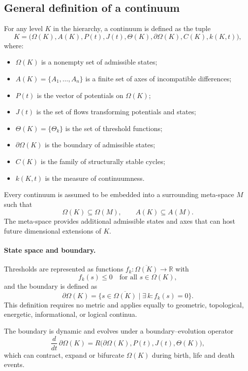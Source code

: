 \subsection{General definition of a continuum}

For any level \(K\) in the hierarchy, a continuum is defined as the tuple
\[
    K = \big(\Omega(K), A(K), P(t), J(t), \Theta(K), \partial\Omega(K), C(K), k(K,t)\big),
\]
where:
\begin{itemize}
    \item \(\Omega(K)\) is a nonempty set of admissible states;
    \item \(A(K) = \{A_1,\dots,A_n\}\) is a finite set of axes of incompatible differences;
    \item \(P(t)\) is the vector of potentials on \(\Omega(K)\);
    \item \(J(t)\) is the set of flows transforming potentials and states;
    \item \(\Theta(K) = \{\Theta_k\}\) is the set of threshold functions;
    \item \(\partial\Omega(K)\) is the boundary of admissible states;
    \item \(C(K)\) is the family of structurally stable cycles;
    \item \(k(K,t)\) is the measure of continuumness.
\end{itemize}

Every continuum is assumed to be embedded into a surrounding meta-space \(M\) such that
\[
    \Omega(K)\subseteq\Omega(M), \qquad A(K)\subseteq A(M).
\]
The meta-space provides additional admissible states and axes that can host future dimensional extensions of \(K\).

\paragraph{State space and boundary.}
Thresholds are represented as functions \(f_k : \overline{\Omega(K)} \to \mathbb{R}\) with
\[
    f_k(s) \le 0 \quad\text{for all } s \in \Omega(K),
\]
and the boundary is defined as
\[
    \partial\Omega(K) = \{ s \in \overline{\Omega(K)} \mid \exists\, k: f_k(s) = 0 \}.
\]
This definition requires no metric and applies equally to geometric, topological, energetic, informational, or logical continua.

The boundary is dynamic and evolves under a boundary–evolution operator
\[
    \frac{d}{dt}\,\partial\Omega(K) = R\big(\partial\Omega(K),P(t),J(t),\Theta(K)\big),
\]
which can contract, expand or bifurcate \(\Omega(K)\) during birth, life and death events.

